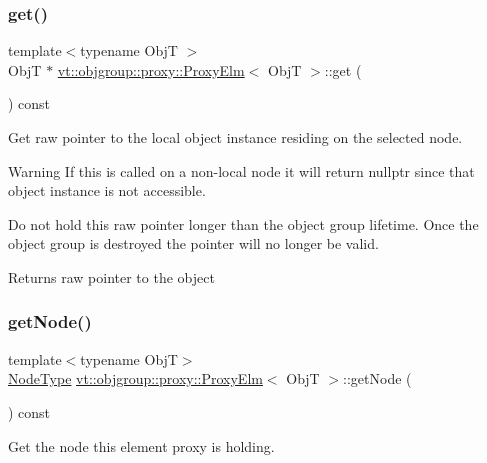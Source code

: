 \subsubsection{\texorpdfstring{get()}{get()}}
{\footnotesize\ttfamily template$<$typename ObjT $>$ \\
ObjT $\ast$ \hyperlink{structvt_1_1objgroup_1_1proxy_1_1_proxy_elm}{vt\+::objgroup\+::proxy\+::\+Proxy\+Elm}$<$ ObjT $>$\+::get (\begin{DoxyParamCaption}{ }\end{DoxyParamCaption}) const}



Get raw pointer to the local object instance residing on the selected node. 

\begin{DoxyWarning}{Warning}
If this is called on a non-\/local node it will return nullptr since that object instance is not accessible.

Do not hold this raw pointer longer than the object group lifetime. Once the object group is destroyed the pointer will no longer be valid.
\end{DoxyWarning}
\begin{DoxyReturn}{Returns}
raw pointer to the object 
\end{DoxyReturn}
\mbox{\label{structvt_1_1objgroup_1_1proxy_1_1_proxy_elm_a2a2067c00f4d5bc4b07dfb371f2f0d7a}} 
\subsubsection{\texorpdfstring{get\+Node()}{getNode()}}
{\footnotesize\ttfamily template$<$typename ObjT$>$ \\
\hyperlink{namespacevt_a866da9d0efc19c0a1ce79e9e492f47e2}{Node\+Type} \hyperlink{structvt_1_1objgroup_1_1proxy_1_1_proxy_elm}{vt\+::objgroup\+::proxy\+::\+Proxy\+Elm}$<$ ObjT $>$\+::get\+Node (\begin{DoxyParamCaption}{ }\end{DoxyParamCaption}) const\hspace{0.3cm}{\ttfamily [inline]}}



Get the node this element proxy is holding. 

